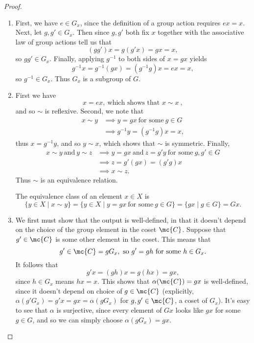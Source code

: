 \documentclass[math1530-lecture-notes]{subfiles}
\begin{document}
\begin{proof}[Proof]
  \begin{enumerate}
    \item First, we have $e\in G_x$, since the definition of a group action requires $ex=x$. Next, let
      $g,g'\in G_x$. Then since $g,g'$ both fix $x$ together with the associative law of group actions
      tell us that \[
        (gg')x=g(g'x)=gx=x
      ,\] so $gg'\in G_x$. Finally, applying $g^{-1}$ to both sides of $x=gx$ yields \[
        g^{-1}x=g^{-1}(gx)=(g^{-1}g)x=ex=x
      ,\] so $g^{-1}\in G_x$. Thus $G_x$ is a subgroup of $G$.
    \item First we have \[
        x=ex, ~\text{which shows that $x\sim x$}~
      ,\] and so $\sim$ is reflexive. Second, we note that
      \begin{align*}
        x\sim y &\implies y=gx ~\text{for some}~g\in G\\
                &\implies g^{-1}y=(g^{-1}g)x=x
      ,\end{align*} thus $x=g^{-1}y$, and so $y\sim x$, which shows that $\sim$ is symmetric. Finally,
      \begin{align*}
        x\sim y~\text{and}~y\sim z &\implies y=gx~\text{and}~z=g'y~\text{for some}~g,g'\in G\\
                                   &\implies z=g'(gx)=(g'g)x\\
                                   &\implies x\sim z
      .\end{align*} Thus $\sim$ is an equivalence relation.

      The equivalence class of an element $x\in X$ is \[
        \{y\in X\mid x\sim y\} =\{y\in X\mid y=gx~\text{for some}~g\in G\} =\{gx\mid g\in G\} =Gx
      .\] 

    \item We first must show that the output is well-defined, in that it doesn't depend on the
      choice of the group element in the coset $\mc{C}$. Suppose that $g'\in \mc{C}$ is some other
      element in the coset. This means that \[
        g'\in \mc{C}=gG_x,~\text{so}~g'=gh~\text{for some}~h\in G_x
      .\] It follows that \[
        g'x=(gh)x=g(hx)=gx
      ,\] since $h\in G_x$ means $hx=x$. This shows that $\alpha(\mc{C})=gx$ is well-defined, since
      it doesn't depend on choice of $g\in \mc{C}$ (explicitly, $\alpha(g'G_x)=g'x=gx=\alpha(gG_x)$
      for $g,g'\in \mc{C}$, a coset of $G_x$). It's easy to see that $\alpha$ is surjective, since
      every element of $Gx$ looks like $gx$ for some $g\in G$, and so we can simply choose
      $\alpha(gG_x)=gx$.


\end{enumerate}
\end{proof}
\end{document}
